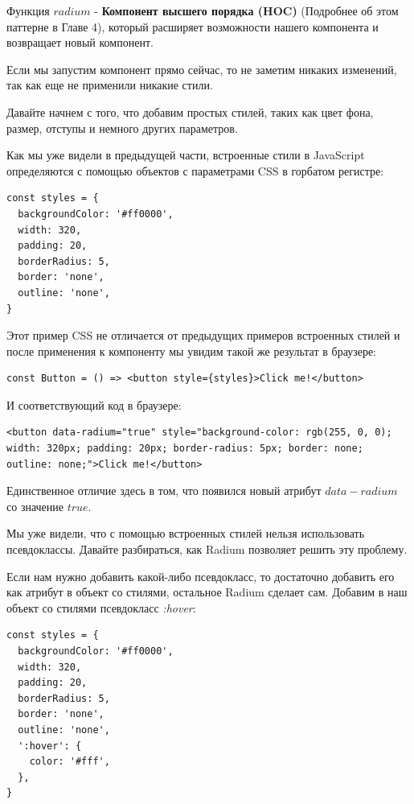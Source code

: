 Функция $radium$ - \textbf{Компонент высшего порядка (HOC)} (Подробнее об этом паттерне в Главе 4), который расширяет возможности нашего компонента и возвращает новый компонент.

Если мы запустим компонент прямо сейчас, то не заметим никаких изменений, так как еще не применили никакие стили.

Давайте начнем с того, что добавим простых стилей, таких как цвет фона, размер, отступы и немного других параметров.

Как мы уже видели в предыдущей части, встроенные стили в JavaScript определяются с помощью объектов с параметрами CSS в горбатом регистре:

\begin{lstlisting}
const styles = {
  backgroundColor: '#ff0000',
  width: 320,
  padding: 20,
  borderRadius: 5,
  border: 'none',
  outline: 'none',
}
\end{lstlisting}

Этот пример CSS не отличается от предыдущих примеров встроенных стилей и после применения к компоненту мы увидим такой же результат в браузере:

\begin{lstlisting}
const Button = () => <button style={styles}>Click me!</button>
\end{lstlisting}

И соответствующий код в браузере:

\begin{lstlisting}
<button data-radium="true" style="background-color: rgb(255, 0, 0); width: 320px; padding: 20px; border-radius: 5px; border: none; outline: none;">Click me!</button>
\end{lstlisting}

Единственное отличие здесь в том, что появился новый атрибут $data-radium$ со значение $true$.

Мы уже видели, что с помощью встроенных стилей нельзя использовать псевдоклассы. Давайте разбираться, как Radium позволяет решить эту проблему.

Если нам нужно добавить какой-либо псевдокласс, то достаточно добавить его как атрибут в объект со стилями, остальное Radium сделает сам. Добавим в наш объект со стилями псевдокласс \textit{:hover}:

\begin{lstlisting}
const styles = {
  backgroundColor: '#ff0000',
  width: 320,
  padding: 20,
  borderRadius: 5,
  border: 'none',
  outline: 'none',
  ':hover': {
    color: '#fff',
  },
}
\end{lstlisting}

